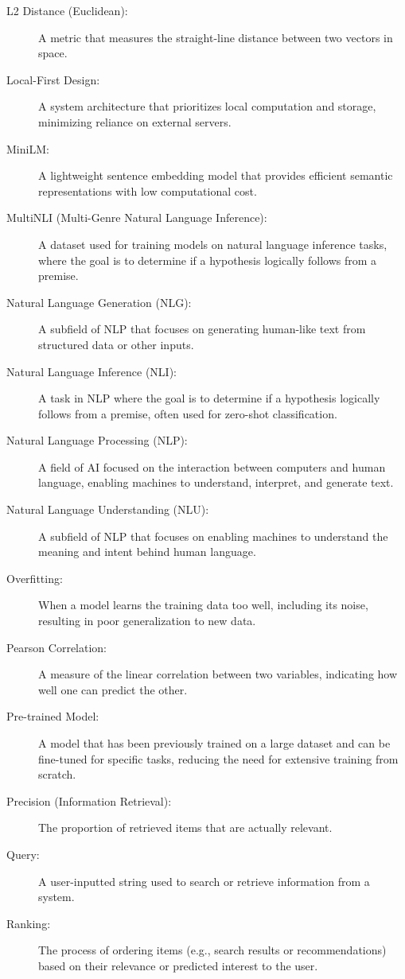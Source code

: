 \begin{description}
    \item[L2 Distance (Euclidean):] A metric that measures the straight-line distance between two vectors in space.
    \item[Local-First Design:] A system architecture that prioritizes local computation and storage, minimizing reliance on external servers.
    \item[MiniLM:] A lightweight sentence embedding model that provides efficient semantic representations with low computational cost.
    \item[MultiNLI (Multi-Genre Natural Language Inference):] A dataset used for training models on natural language inference tasks, where the goal is to determine if a hypothesis logically follows from a premise.
    \item[Natural Language Generation (NLG):] A subfield of NLP that focuses on generating human-like text from structured data or other inputs.
    \item[Natural Language Inference (NLI):] A task in NLP where the goal is to determine if a hypothesis logically follows from a premise, often used for zero-shot classification.
    \item[Natural Language Processing (NLP):] A field of AI focused on the interaction between computers and human language, enabling machines to understand, interpret, and generate text.
    \item[Natural Language Understanding (NLU):] A subfield of NLP that focuses on enabling machines to understand the meaning and intent behind human language.
    \item[Overfitting:] When a model learns the training data too well, including its noise, resulting in poor generalization to new data.
    \item[Pearson Correlation:] A measure of the linear correlation between two variables, indicating how well one can predict the other.
    \item[Pre-trained Model:] A model that has been previously trained on a large dataset and can be fine-tuned for specific tasks, reducing the need for extensive training from scratch.
    \item[Precision (Information Retrieval):] The proportion of retrieved items that are actually relevant.
    \item[Query:] A user-inputted string used to search or retrieve information from a system.
    \item[Ranking:] The process of ordering items (e.g., search results or recommendations) based on their relevance or predicted interest to the user.

\end{description}
